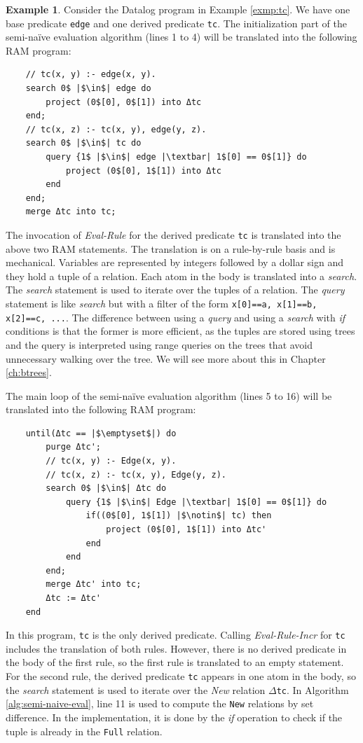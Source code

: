 \documentclass[11pt]{report}
\theoremstyle{definition}
\newtheorem{exmp}{Example}[chapter]
\begin{document}
\begin{exmp}
  Consider the Datalog program in Example \ref{exmp:tc}. We have one base predicate \texttt{edge} and one derived predicate \texttt{tc}. The initialization part of the semi-naïve evaluation algorithm (lines 1 to 4) will be translated into the following RAM program:
  \begin{verbatim}
    // tc(x, y) :- edge(x, y).
    search 0$ |$\in$| edge do
        project (0$[0], 0$[1]) into Δtc
    end;
    // tc(x, z) :- tc(x, y), edge(y, z).
    search 0$ |$\in$| tc do
        query {1$ |$\in$| edge |\textbar| 1$[0] == 0$[1]} do
            project (0$[0], 1$[1]) into Δtc
        end
    end;
    merge Δtc into tc;
  \end{verbatim}
  The invocation of \textit{Eval-Rule} for the derived predicate \texttt{tc} is translated into the above two RAM statements. The translation is on a rule-by-rule basis and is mechanical. Variables are represented by integers followed by a dollar sign and they hold a tuple of a relation. Each atom in the body is translated into a \textit{search}. The \textit{search} statement is used to iterate over the tuples of a relation. The \textit{query} statement is like \textit{search} but with a filter of the form \texttt{x[0]==a, x[1]==b, x[2]==c, ...}. The difference between using a \textit{query} and using a \textit{search} with \textit{if} conditions is that the former is more efficient, as the tuples are stored using trees and the query is interpreted using range queries on the trees that avoid unnecessary walking over the tree. We will see more about this in Chapter \ref{ch:btrees}.

  The main loop of the semi-naïve evaluation algorithm (lines 5 to 16) will be translated into the following RAM program:
  \begin{verbatim}
    until(Δtc == |$\emptyset$|) do
        purge Δtc';
        // tc(x, y) :- Edge(x, y).
        // tc(x, z) :- tc(x, y), Edge(y, z).
        search 0$ |$\in$| Δtc do
            query {1$ |$\in$| Edge |\textbar| 1$[0] == 0$[1]} do
                if((0$[0], 1$[1]) |$\notin$| tc) then
                    project (0$[0], 1$[1]) into Δtc'
                end
            end
        end;
        merge Δtc' into tc;
        Δtc := Δtc'
    end
  \end{verbatim}

  In this program, \texttt{tc} is the only derived predicate. Calling \textit{Eval-Rule-Incr} for \texttt{tc} includes the translation of both rules. However, there is no derived predicate in the body of the first rule, so the first rule is translated to an empty statement. For the second rule, the derived predicate \texttt{tc} appears in one atom in the body, so the \textit{search} statement is used to iterate over the \textit{New} relation $\Delta$\texttt{tc}. In Algorithm \ref{alg:semi-naive-eval}, line 11 is used to compute the \texttt{New} relations by set difference. In the implementation, it is done by the \textit{if} operation to check if the tuple is already in the \texttt{Full} relation.
\end{exmp}
\label{exmp:tc-ram}
\end{document}
